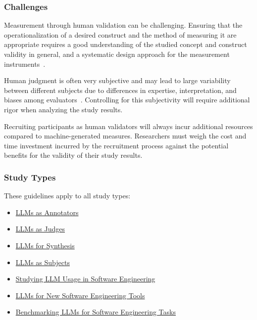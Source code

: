\subsubsection{Challenges}

Measurement through human validation can be challenging.
Ensuring that the operationalization of a desired construct and the method of measuring it are appropriate requires a good understanding of the studied concept and construct validity in general, and a systematic design approach for the measurement instruments~\cite{DBLP:journals/tse/SjobergB23}.

Human judgment is often very subjective and may lead to large variability between different subjects due to differences in expertise, interpretation, and biases among evaluators~\cite{DBLP:journals/pacmhci/McDonaldSF19}.
Controlling for this subjectivity will require additional rigor when analyzing the study results.

Recruiting participants as human validators will always incur additional resources compared to machine-generated measures.
Researchers must weigh the cost and time investment incurred by the recruitment process against the potential benefits for the validity of their study results.

\subsubsection{Study Types}

These guidelines apply to all study types:

\begin{itemize}
    \item \href{/study-types/#llms-as-annotators}{LLMs as Annotators}
    \item \href{/study-types/#llms-as-judges}{LLMs as Judges}
    \item \href{/study-types/#llms-for-synthesis}{LLMs for Synthesis}
    \item \href{/study-types/#llms-as-subjects}{LLMs as Subjects}
    \item \href{/study-types/#studying-llm-usage-in-software-engineering}{Studying LLM Usage in Software Engineering}
    \item \href{/study-types/#llms-for-new-software-engineering-tools}{LLMs for New Software Engineering Tools}
    \item \href{/study-types/#benchmarking-llms-for-software-engineering-tasks}{Benchmarking LLMs for Software Engineering Tasks}
\end{itemize}

